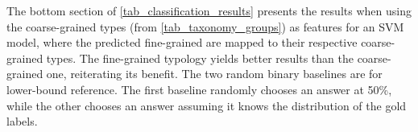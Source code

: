 The bottom section of \autoref{tab_classification_results} presents the results when using the coarse-grained types (from \autoref{tab_taxonomy_groups}) as features for an SVM model, where the predicted fine-grained \taxtypes{} are mapped to their respective coarse-grained types. The fine-grained typology yields better results than the coarse-grained one, reiterating its benefit. The two random binary baselines are for lower-bound reference. The first baseline randomly chooses an answer at 50\%, while the other chooses an answer assuming it knows the distribution of the gold labels.


%
%
%
%






